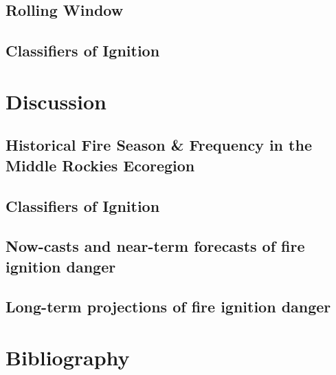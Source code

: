 \documentclass{article}
\begin{document}
\subsection{Rolling Window}
\subsection{Classifiers of Ignition}

\section{Discussion}
\subsection{Historical Fire Season \& Frequency in the Middle Rockies Ecoregion}
\subsection{Classifiers of Ignition}
\subsection{Now-casts and near-term forecasts of fire ignition danger}
\subsection{Long-term projections of fire ignition danger}


\section{Bibliography}
\printbibliography
\end{document}
